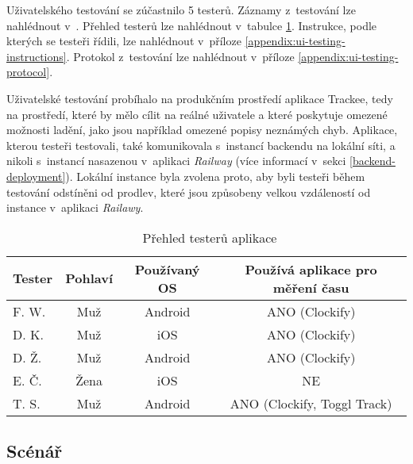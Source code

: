 Uživatelského testování se zúčastnilo 5 testerů. Záznamy z~testování lze nahlédnout v~\cite{ui-testing-playlist}. Přehled testerů lze nahlédnout v~tabulce \ref{table:testers}. Instrukce, podle kterých se testeři řídili, lze nahlédnout v~příloze \ref{appendix:ui-testing-instructions}. Protokol z~testování lze nahlédnout v~příloze \ref{appendix:ui-testing-protocol}.

Uživatelské testování probíhalo na produkčním prostředí aplikace Trackee, tedy na prostředí, které by mělo cílit na reálné uživatele a které poskytuje omezené možnosti ladění, jako jsou například omezené popisy neznámých chyb. Aplikace, kterou testeři testovali, také komunikovala s~instancí backendu na lokální síti, a nikoli s~instancí nasazenou v~aplikaci \emph{Railway} (více informací v~sekci \ref{backend-deployment}). Lokální instance byla zvolena proto, aby byli testeři během testování odstíněni od prodlev, které jsou způsobeny velkou vzdáleností od instance v~aplikaci \emph{Railawy}.

\begin{table}\centering
\begin{tabular}{l|c|c|c}
	Tester		& Pohlaví	& Používaný OS	& Používá aplikace pro měření času	\tabularnewline \hline 
 	F. W.		& Muž		& Android       & ANO (Clockify)	                \tabularnewline \hline
	D. K.		& Muž		& iOS	        & ANO (Clockify)                	\tabularnewline \hline
	D. Ž.		& Muž		& Android       & ANO (Clockify)               		\tabularnewline \hline
	E. Č.		& Žena		& iOS	        & NE 	                	        \tabularnewline \hline
	T. S.		& Muž		& Android       & ANO (Clockify, Toggl Track)	    \tabularnewline \hline
\end{tabular}
\vspace{0.5cm}
\caption[Přehled testerů aplikace]{~Přehled testerů aplikace}\label{table:testers}
\end{table} 

\subsection{Scénář}

